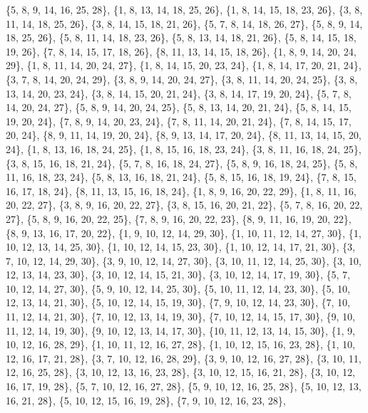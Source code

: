 \documentclass[11pt,a4paper]{article}
\begin{document}
{\{5, 8, 9, 14, 16, 25, 28\}, \{1, 8, 13, 14, 18, 25, 26\}, \{1, 8, 14, 15, 18, 23, 26\}, \{3, 8, 11, 14, 18, 25, 26\}, \{3, 8, 14, 15, 18, 21, 26\},
\{5, 7, 8, 14, 18, 26, 27\}, \{5, 8, 9, 14, 18, 25, 26\}, \{5, 8, 11, 14, 18, 23, 26\}, \{5, 8, 13, 14, 18, 21, 26\}, \{5, 8, 14, 15, 18, 19, 26\},
\{7, 8, 14, 15, 17, 18, 26\}, \{8, 11, 13, 14, 15, 18, 26\}, \{1, 8, 9, 14, 20, 24, 29\}, \{1, 8, 11, 14, 20, 24, 27\}, \{1, 8, 14, 15, 20, 23, 24\},
\{1, 8, 14, 17, 20, 21, 24\}, \{3, 7, 8, 14, 20, 24, 29\}, \{3, 8, 9, 14, 20, 24, 27\}, \{3, 8, 11, 14, 20, 24, 25\}, \{3, 8, 13, 14, 20, 23, 24\},
\{3, 8, 14, 15, 20, 21, 24\}, \{3, 8, 14, 17, 19, 20, 24\}, \{5, 7, 8, 14, 20, 24, 27\}, \{5, 8, 9, 14, 20, 24, 25\}, \{5, 8, 13, 14, 20, 21, 24\},
\{5, 8, 14, 15, 19, 20, 24\}, \{7, 8, 9, 14, 20, 23, 24\}, \{7, 8, 11, 14, 20, 21, 24\}, \{7, 8, 14, 15, 17, 20, 24\}, \{8, 9, 11, 14, 19, 20, 24\},
\{8, 9, 13, 14, 17, 20, 24\}, \{8, 11, 13, 14, 15, 20, 24\}, \{1, 8, 13, 16, 18, 24, 25\}, \{1, 8, 15, 16, 18, 23, 24\}, \{3, 8, 11, 16, 18, 24, 25\},
\{3, 8, 15, 16, 18, 21, 24\}, \{5, 7, 8, 16, 18, 24, 27\}, \{5, 8, 9, 16, 18, 24, 25\}, \{5, 8, 11, 16, 18, 23, 24\}, \{5, 8, 13, 16, 18, 21, 24\},
\{5, 8, 15, 16, 18, 19, 24\}, \{7, 8, 15, 16, 17, 18, 24\}, \{8, 11, 13, 15, 16, 18, 24\}, \{1, 8, 9, 16, 20, 22, 29\}, \{1, 8, 11, 16, 20, 22, 27\},
\{3, 8, 9, 16, 20, 22, 27\}, \{3, 8, 15, 16, 20, 21, 22\}, \{5, 7, 8, 16, 20, 22, 27\}, \{5, 8, 9, 16, 20, 22, 25\}, \{7, 8, 9, 16, 20, 22, 23\},
\{8, 9, 11, 16, 19, 20, 22\}, \{8, 9, 13, 16, 17, 20, 22\}, \{1, 9, 10, 12, 14, 29, 30\}, \{1, 10, 11, 12, 14, 27, 30\}, \{1, 10, 12, 13, 14, 25, 30\},
\{1, 10, 12, 14, 15, 23, 30\}, \{1, 10, 12, 14, 17, 21, 30\}, \{3, 7, 10, 12, 14, 29, 30\}, \{3, 9, 10, 12, 14, 27, 30\}, \{3, 10, 11, 12, 14, 25, 30\},
\{3, 10, 12, 13, 14, 23, 30\}, \{3, 10, 12, 14, 15, 21, 30\}, \{3, 10, 12, 14, 17, 19, 30\}, \{5, 7, 10, 12, 14, 27, 30\}, \{5, 9, 10, 12, 14, 25, 30\},
\{5, 10, 11, 12, 14, 23, 30\}, \{5, 10, 12, 13, 14, 21, 30\}, \{5, 10, 12, 14, 15, 19, 30\}, \{7, 9, 10, 12, 14, 23, 30\}, \{7, 10, 11, 12, 14, 21, 30\},
\{7, 10, 12, 13, 14, 19, 30\}, \{7, 10, 12, 14, 15, 17, 30\}, \{9, 10, 11, 12, 14, 19, 30\}, \{9, 10, 12, 13, 14, 17, 30\}, \{10, 11, 12, 13, 14, 15, 30\},
\{1, 9, 10, 12, 16, 28, 29\}, \{1, 10, 11, 12, 16, 27, 28\}, \{1, 10, 12, 15, 16, 23, 28\}, \{1, 10, 12, 16, 17, 21, 28\}, \{3, 7, 10, 12, 16, 28, 29\},
\{3, 9, 10, 12, 16, 27, 28\}, \{3, 10, 11, 12, 16, 25, 28\}, \{3, 10, 12, 13, 16, 23, 28\}, \{3, 10, 12, 15, 16, 21, 28\}, \{3, 10, 12, 16, 17, 19, 28\},
\{5, 7, 10, 12, 16, 27, 28\}, \{5, 9, 10, 12, 16, 25, 28\}, \{5, 10, 12, 13, 16, 21, 28\}, \{5, 10, 12, 15, 16, 19, 28\}, \{7, 9, 10, 12, 16, 23, 28\},
}
\end{document}
